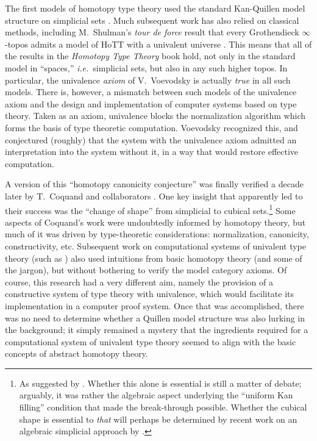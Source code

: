\documentclass[11pt,reqno]{amsart}
\newcommand{\ie}{\emph{i.e.}}
\theoremstyle{remark}
\theoremstyle{definition}
\begin{document}
The first models of homotopy type theory used the standard Kan-Quillen model structure on simplicial sets \cite{awodey-warren:homotopy-idtype,KLV:21}. Much subsequent work has also relied on classical methods, including M.~Shulman's \emph{tour de force} result that  every Grothendieck $\infty$-topos admits a model of HoTT with a univalent universe \cite{shulman2019infty1toposes}.  This means that all of the results in the \emph{Homotopy Type Theory} book \cite{hottbook} hold, not only in the standard model in ``spaces,'' \ie\ simplicial sets, but also in any such higher topos.  In particular, the univalence \emph{axiom} of V.~Voevodsky is actually \emph{true} in all such models.
There is, however, a mismatch between such models of the univalence axiom and the design and implementation of computer systems based on type theory.  Taken as an axiom, univalence blocks the normalization algorithm which forms the basis of type theoretic computation. Voevodsky recognized this, and conjectured (roughly) that the system with the univalence axiom admitted an interpretation into the system without it, in a way that would restore effective computation.  

A version of this ``homotopy canonicity conjecture'' was finally verified a decade later by T.~Coquand and collaborators \cite{BCH,CCHM:2018ctt}.  One key insight that apparently led to their success was the ``change of shape'' from simplicial to cubical sets.\footnote{As suggested by \cite{BC:Kripke2015}.  Whether this alone is essential is still a matter of debate; arguably, it was rather the algebraic aspect underlying the ``uniform Kan filling'' condition that made the break-through possible.  Whether the cubical shape is essential to \emph{that} will perhaps be determined by recent work on an algebraic simplicial approach by \cite{gambino-henry}.}  
Some aspects of Coquand's work were undoubtedly informed by homotopy theory, but much of it was driven by type-theoretic considerations: normalization, canonicity, constructivity, etc.   
Subsequent work on computational systems of univalent type theory (such as \cite{orton-pitts,LOPS18,ABCHFL}) also used intuitions from basic homotopy theory (and some of the jargon), but without bothering to verify the model category axioms.  Of course, this research had a very different aim, namely the provision of a constructive system of type theory with univalence, which would facilitate its implementation in a computer proof system.  Once that was accomplished, there was no need to determine whether a Quillen model structure was also lurking in the background; it simply remained a mystery that the ingredients required for a computational system of univalent type theory seemed to align with the basic concepts of abstract homotopy theory.  
\end{document}
